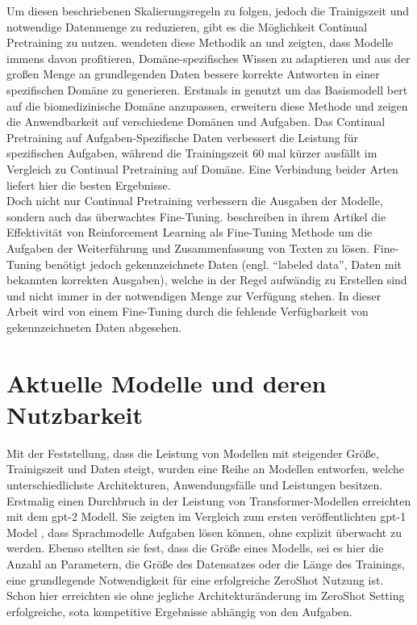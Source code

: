 Um diesen beschriebenen Skalierungsregeln zu folgen, jedoch die Trainigszeit und notwendige Datenmenge zu reduzieren, gibt es die Möglichkeit Continual Pretraining zu nutzen. 
\citet{dont_stop_pretraining} wendeten diese Methodik an und zeigten, dass Modelle immens davon profitieren, Domäne-spezifisches Wissen zu adaptieren und aus der großen Menge an grundlegenden Daten bessere korrekte Antworten in einer spezifischen Domäne zu generieren. 
Erstmals in \citet{biobert} genutzt um das Basismodell \ac{bert} auf die biomedizinische Domäne anzupassen, erweitern \citet{dont_stop_pretraining} diese Methode und zeigen die Anwendbarkeit auf verschiedene Domänen und Aufgaben. 
Das Continual Pretraining auf Aufgaben-Spezifische Daten verbessert die Leistung für spezifischen Aufgaben, während die Trainingszeit 60 mal kürzer ausfällt im Vergleich zu Continual Pretraining auf Domäne. 
Eine Verbindung beider Arten liefert hier die besten Ergebnisse.\\

Doch nicht nur Continual Pretraining verbessern die Ausgaben der Modelle, sondern auch das überwachtes Fine-Tuning. 
\citet{finetuning} beschreiben in ihrem Artikel die Effektivität von Reinforcement Learning als Fine-Tuning Methode um die Aufgaben der Weiterführung und Zusammenfassung von Texten zu lösen. 
Fine-Tuning benötigt jedoch gekennzeichnete Daten (engl. \enquote{labeled data}, Daten mit bekannten korrekten Ausgaben), welche in der Regel aufwändig zu Erstellen sind und nicht immer in der notwendigen Menge zur Verfügung stehen. 
In dieser Arbeit wird von einem Fine-Tuning durch die fehlende Verfügbarkeit von gekennzeichneten Daten abgesehen.\\
\section{Aktuelle Modelle und deren Nutzbarkeit}

Mit der Feststellung, dass die Leistung von Modellen mit steigender Größe, Trainigszeit und Daten steigt, wurden eine Reihe an Modellen entworfen, welche unterschiedlichste Architekturen, Anwendungsfälle und Leistungen besitzen.
Erstmalig einen Durchbruch in der Leistung von Transformer-Modellen erreichten \citet{gpt2} mit dem \ac{gpt}-2 Modell.
Sie zeigten im Vergleich zum ersten veröffentlichten \ac{gpt}-1 Model \citep{gpt1}, dass Sprachmodelle Aufgaben lösen können, ohne explizit überwacht zu werden.
Ebenso stellten sie fest, dass die Größe eines Modells, sei es hier die Anzahl an Parametern, die Größe des Datensatzes oder die Länge des Trainings, eine grundlegende Notwendigkeit für eine erfolgreiche ZeroShot Nutzung ist.
Schon hier erreichten sie ohne jegliche Architekturänderung im ZeroShot Setting erfolgreiche, \ac{sota} kompetitive Ergebnisse abhängig von den Aufgaben.\\

